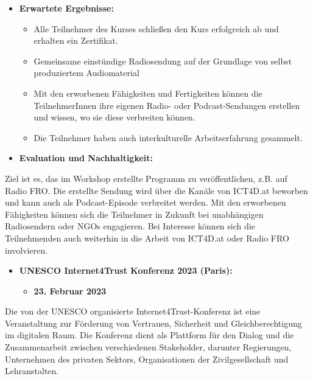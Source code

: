 \begin{itemize}
    \item \textbf{Erwartete Ergebnisse:}
          \begin{itemize}
              \item {Alle Teilnehmer des Kurses schließen den Kurs erfolgreich ab und erhalten ein Zertifikat.}
              \item {Gemeinsame einstündige Radiosendung auf der Grundlage von selbst produziertem Audiomaterial}
              \item {Mit den erworbenen Fähigkeiten und Fertigkeiten können die TeilnehmerInnen ihre eigenen Radio- oder Podcast-Sendungen erstellen und wissen, wo sie diese verbreiten können.}
              \item {Die Teilnehmer haben auch interkulturelle Arbeitserfahrung gesammelt.}
          \end{itemize}
\end{itemize}

\begin{itemize}
    \item \textbf{Evaluation und Nachhaltigkeit:}
\end{itemize}

Ziel ist es, das im Workshop erstellte Programm zu veröffentlichen, z.B. auf Radio FRO. Die erstellte Sendung wird über die Kanäle von ICT4D.at beworben und kann auch als Podcast-Episode verbreitet werden. Mit den erworbenen Fähigkeiten können sich die Teilnehmer in Zukunft bei unabhängigen Radiosendern oder NGOs engagieren. Bei Interesse können sich die Teilnehmenden auch weiterhin in die Arbeit von ICT4D.at oder Radio FRO involvieren.

\begin{itemize}
    \item \textbf{UNESCO Internet4Trust Konferenz 2023 (Paris):}
          \begin{itemize}
              \item \textbf{23. Februar 2023}
          \end{itemize}
\end{itemize}

Die von der UNESCO organisierte Internet4Trust-Konferenz ist eine Veranstaltung zur Förderung von Vertrauen, Sicherheit und Gleichberechtigung im digitalen Raum. Die Konferenz dient als Plattform für den Dialog und die Zusammenarbeit zwischen verschiedenen Stakeholder, darunter Regierungen, Unternehmen des privaten Sektors, Organisationen der Zivilgesellschaft und Lehranstalten.

